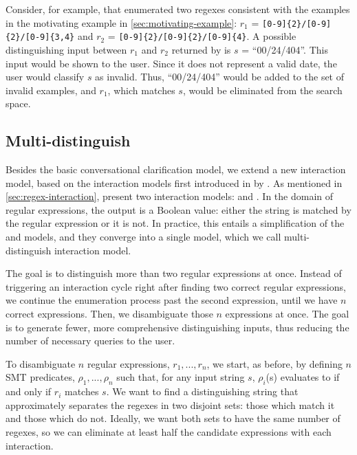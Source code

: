 \begin{example}
Consider, for example, that \Forest{} enumerated two regexes consistent with the examples in the motivating example in \autoref{sec:motivating-example}:
\(r_1\) = \Verb![0-9]{2}/[0-9]{2}/[0-9]{3,4}!
and
\(r_2\) = 
\Verb![0-9]{2}/[0-9]{2}/[0-9]{4}!. 
A possible distinguishing input between \(r_1\) and \(r_2\) returned by \Forest{} is \(s\) = ``00/24/404''. This input would be shown to the user. Since it does not represent a valid date, the user would classify \(s\) as invalid. Thus, ``00/24/404'' would be added to the set of invalid examples, and \(r_1\), which matches \(s\), would be eliminated from the search space.
\end{example}



\subsection{Multi-distinguish}\label{sec:interaction-ramos}

Besides the basic conversational clarification model, we extend \Forest{} a new interaction model, based on the interaction models first introduced in \citeyear{UnchartIt20} by \citet{UnchartIt20}. 
As mentioned in \autoref{sec:regex-interaction}, \citeauthor{UnchartIt20} present two interaction models: \ynmodel and \optmodel.
In the domain of regular expressions, the output is a Boolean value: either the string is matched by the regular expression or it is not. In practice, this entails a simplification of the \ynmodel and \optmodel models, and they converge into a single model, which we call multi-distinguish interaction model.

The goal is to distinguish more than two regular expressions at once. Instead of triggering an interaction cycle right after finding two correct regular expressions, we continue the enumeration process past the second expression, until we have \(n\) correct expressions. Then, we disambiguate those \(n\) expressions at once. The goal is to generate fewer, more comprehensive distinguishing inputs, thus reducing the number of necessary queries to the user.

To disambiguate \(n\) regular expressions, \(r_1, ..., r_n\), we start, as before, by defining \(n\) \ac{SMT} predicates, \(\rho_1, ..., \rho_n\) such that, for any input string \(s\), \(\rho_i\)(s) evaluates to \true{} if and only if \(r_i\) matches \(s\).
We want to find a distinguishing string that approximately separates the regexes in two disjoint sets: those which match it and those which do not. Ideally, we want both sets to have the same number of regexes, so we can eliminate at least half the candidate expressions with each interaction.

